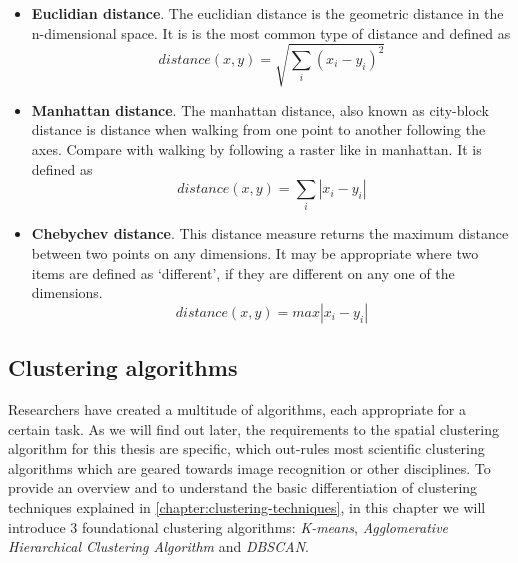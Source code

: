 \begin{itemize}

\item \textbf{Euclidian distance}. The euclidian distance is the geometric distance in the n-dimensional space. It is is the most common type of distance and defined as
\[ distance(x, y) = \sqrt{\sum_{i} (x_i - y_i)^2} \]

\item \textbf{Manhattan distance}. The manhattan distance, also known as city-block distance is distance when walking from one point to another following the axes. Compare with walking by following a raster like in manhattan. It is defined as
\[ distance(x, y) = \sum_{i} |x_i - y_i| \]

\item \textbf{Chebychev distance}. This distance measure returns the maximum distance between two points on any dimensions. It may be appropriate where two items are defined as `different', if they are different on any one of the dimensions.
\[ distance(x, y) = max |x_i - y_i| \]

\end{itemize}


\subsection{Clustering algorithms}

Researchers have created a multitude of algorithms, each appropriate for a certain task. As we will find out later, the requirements to the spatial clustering algorithm for this thesis are specific, which out-rules most scientific clustering algorithms which are geared towards image recognition or other disciplines. To provide an overview and to understand the basic differentiation of clustering techniques explained in \ref{chapter:clustering-techniques}, in this chapter we will introduce 3 foundational clustering algorithms: \textit{K-means}, \textit{Agglomerative Hierarchical Clustering Algorithm} and \textit{DBSCAN}.

